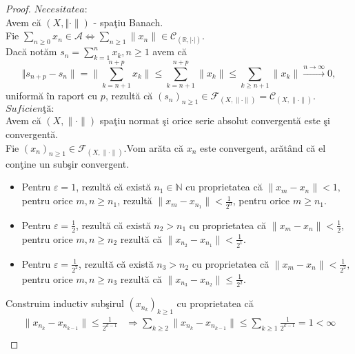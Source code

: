 \documentclass[ a4paper, 12pt]{report}
\theoremstyle{definition}
\theoremstyle{remark}
\numberwithin{equation}{section}
\begin{document}
\begin{proof}
$\textit{Necesitatea:}$ \\
Avem c\u a  $(X, \Vert \cdot \rVert)$ - spa\c tiu Banach.\\
Fie $\sum\limits_{n \geq 0} x_n \in \mathcal{A} \Leftrightarrow \sum\limits_{n \geq 1} \lVert x_n \rVert \in \mathcal{C}_{(\mathbb{R},\lvert \cdot \rvert)} .$\\
Dac\u a not\u am $s_n = \sum\limits_{k=1}^{n} x_k, n \geq 1$ avem c\u a 
$$ \Vert s_{n+p} - s_n \rVert =\lVert \sum\limits_{k=n+1}^{n+p} x_k \rVert
\leq  \sum\limits_{k=n+1}^{n+p} \lVert x_k \rVert \leq \sum\limits_{k \geq n+1} \lVert x_k \rVert \stackrel{n \rightarrow \infty}{\longrightarrow}0,$$ uniform\u a \^in raport cu $p$, rezult\u a c\u a $(s_n)_{n \geq 1} \in \mathcal{F}_{(X,\lVert \cdot \rVert)} = \mathcal{C}_{(X, \lVert  \cdot\rVert)}.$\\
$\textit{Suficien\c t\u a:}$\\
Avem c\u a $(X,\lVert \cdot \rVert)$ spa\c tiu normat \c si  orice serie absolut convergent\u a este \c si convergent\u a.\\
Fie $(x_n)_{n \geq 1} \in \mathcal{F}_{(X, \lVert \cdot \rVert)}.$Vom ar\u ata c\u a $x_n$ este convergent, ar\u at\^and c\u a el con\c tine un sub\c sir convergent.\\
\begin{itemize}
\item Pentru $\varepsilon\!=\!1$, rezult\u a c\u a exist\u a $n_1 \in \mathbb{N}$ cu proprietatea c\u a $\lVert x_m - x_n \rVert < 1,$ pentru orice $m,n \geq n_1$, rezult\u a $\lVert x_m-x_{n_1}\rVert<\frac{1}{2^0}$, pentru orice  $m \geq n_1$.
\item Pentru $\varepsilon\!\!=\!\!\frac{1}{2}$,  rezult\u a c\u a exist\u a $n_2 > n_1$ cu proprietatea c\u a $\lVert x_m - x_n \rVert < \frac{1}{2}$, pentru orice $m,n \geq n_2$ rezult\u a c\u  a $\lVert x_{n_2}-x_{n_1}\rVert<\frac{1}{2^1}$.
\item Pentru $\varepsilon\!\!=\!\!\frac{1}{2^2}$,  rezult\u a c\u a exist\u a $n_3\!\!>\!\!n_2$ cu proprietatea c\u a $\lVert x_m - x_n \rVert < \frac{1}{2^2},$ pentru orice $m,n \geq n_3$ rezult\u a c\u a $\lVert x_{n_3}-x_{n_2}\rVert \leq \frac{1}{2^2}$.
\end{itemize}
Construim inductiv sub\c sirul $(x_{n_k})_{k \geq 1}$ cu proprietatea c\u a
 \begin{align*}
 \lVert x_{n_k} - x_{n_{k-1}} \rVert \leq \frac{1}{2^{k-1}} &\Rightarrow \sum\limits_{k \geq 2} \lVert x_{n_k} - x_{n_{k-1}} \rVert \leq \sum\limits_{k \geq 1}\frac{1}{2^{k-1}} = 1 < \infty \\

\end{align*}
\end{proof}
\end{document}
